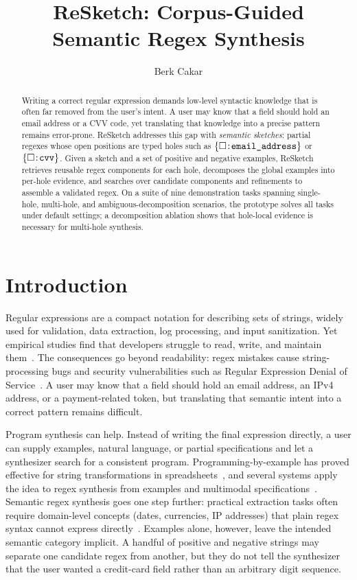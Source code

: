 \documentclass[sigconf,nonacm]{acmart}
\title{ReSketch: Corpus-Guided Semantic Regex Synthesis}
\author{Berk Cakar}
\affiliation{%
  \department{Course Project Final Report\\ECE 663: Program Synthesis\\Spring 2026}
  \institution{Purdue University}
  \city{West Lafayette}
  \state{IN}
  \country{USA}}
\newcommand{\hole}[1]{\ensuremath{\{\square\!:\!\text{\texttt{#1}}\}}}
\begin{document}
\begin{abstract}
Writing a correct regular expression demands low-level syntactic knowledge
that is often far removed from the user's intent.
A user may know that a field should hold an email address or a CVV code,
yet translating that knowledge into a precise pattern remains error-prone.
ReSketch addresses this gap with \emph{semantic sketches}: partial regexes
whose open positions are typed holes such as \hole{email\_address} or
\hole{cvv}.
Given a sketch and a set of positive and negative examples, ReSketch
retrieves reusable regex components for each hole, decomposes the global
examples into per-hole evidence, and searches over candidate components
and refinements to assemble a validated regex.
On a suite of nine demonstration tasks spanning single-hole, multi-hole, and
ambiguous-decomposition scenarios, the prototype solves all tasks under
default settings; a decomposition ablation shows that hole-local
evidence is necessary for multi-hole synthesis.
\end{abstract}

\maketitle

\section{Introduction}
Regular expressions are a compact notation for describing sets of strings,
widely used for validation, data extraction, log processing, and input
sanitization. Yet empirical studies find that developers struggle
to read, write, and maintain
them~\cite{michael2019regexes}. The consequences go beyond readability:
regex mistakes cause string-processing bugs and security vulnerabilities such
as Regular Expression Denial of
Service~\cite{wang2021demystifying,davis2018redos,davis2021memoization,bhuiyan2025sok}.
A user may know that a field should hold an email address, an IPv4 address, or
a payment-related token, but translating that semantic intent into a correct
pattern remains difficult.

Program synthesis can help. Instead of writing the final expression directly,
a user can supply examples, natural language, or partial specifications and let
a synthesizer search for a consistent
program. Programming-by-example has proved effective for string transformations
in spreadsheets~\cite{gulwani2011automating}, and several systems apply the
idea to regex synthesis from examples and multimodal
specifications~\cite{lee2016synthesizing,chen2020multimodal}. Semantic regex
synthesis goes one step further: practical extraction tasks often require
domain-level concepts (dates, currencies, IP addresses) that plain regex syntax
cannot express directly~\cite{chen2023data}. Examples alone, however, leave
the intended semantic category implicit. A handful of positive and negative
strings may separate one candidate regex from another, but they do not tell the
synthesizer that the user wanted a credit-card field rather than an arbitrary
digit sequence.
\end{document}
